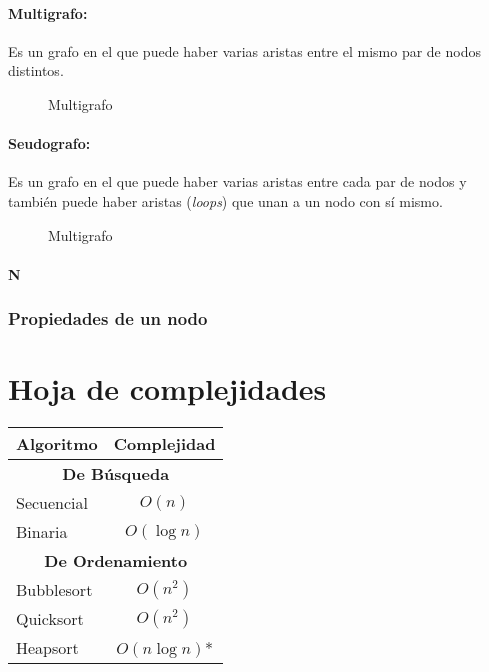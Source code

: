 \paragraph{Multigrafo:} Es un grafo en el que puede haber varias aristas entre el mismo par de nodos distintos.
		\begin{figure}[H]
	\begin{center}
	\end{center}		
	\caption{Multigrafo}
\end{figure}
\paragraph{Seudografo:} Es un grafo en el que puede haber varias aristas entre cada par de nodos y también puede haber aristas (\textit{loops}) que unan a un nodo con sí mismo.
	
\begin{figure}[H]
	\begin{center}
	\end{center}		
	\caption{Multigrafo}
\end{figure}

\paragraph{N}
\subsubsection{Propiedades de un nodo}
\appendix
\section{Hoja de complejidades}
\begin{center}
\begin{tabular}{|l|c|}
	\hline
	\textbf{Algoritmo} & \textbf{Complejidad} \\
	\hline
	\multicolumn{2}{|c|}{\cellcolor{blue!25}\textbf{De Búsqueda}}\\
	\hline
	Secuencial & \(O(n)\) \\
	\hline
	Binaria & \(O(\log{n})\) \\
	\hline
	\multicolumn{2}{|c|}{\cellcolor{blue!25}\textbf{De Ordenamiento}}\\
	\hline
	Bubblesort & \(O(n^2)\) \\
	\hline
	Quicksort & \(O(n^2)\) \\
	\hline
	Heapsort & \(O(n\log{n})\)* \\
	\hline
\end{tabular}
\end{center}

